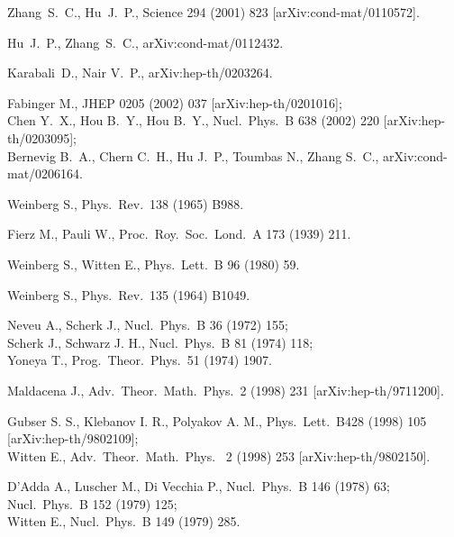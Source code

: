 \documentclass[a4paper,12pt]{article}
\begin{document}
\begin{thebibliography}{10}
\baselineskip=15pt

Zhang~S.~C., Hu~J.~P.,
Science {294} (2001) 823
[arXiv:cond-mat/0110572].

Hu~J.~P., Zhang~S.~C.,
arXiv:cond-mat/0112432.

Karabali~D., Nair V.~P.,
arXiv:hep-th/0203264.

Fabinger M.,
JHEP {0205} (2002) 037
[arXiv:hep-th/0201016];\\
Chen Y.~X., Hou B.~Y., Hou B.~Y.,
Nucl.\ Phys.\ B {638} (2002) 220
[arXiv:hep-th/0203095];\\
Bernevig B.~A., Chern C.~H., Hu J.~P., Toumbas N., Zhang S.~C.,
arXiv:cond-mat/0206164.

Weinberg S.,
Phys.\ Rev.\  {138} (1965) B988.

Fierz M., Pauli W.,
Proc.\ Roy.\ Soc.\ Lond.\ A {173} (1939) 211.

Weinberg S., Witten E.,
Phys.\ Lett.\ B {96} (1980) 59.

Weinberg S.,
Phys.\ Rev.\  {135} (1964) B1049.

Neveu A., Scherk J.,
Nucl.\ Phys.\ B {36} (1972) 155;\\
Scherk J., Schwarz J. H.,
Nucl.\ Phys.\ B {81} (1974) 118;\\
Yoneya T.,
Prog.\ Theor.\ Phys.\  {51} (1974) 1907.

Maldacena J.,
Adv.\ Theor.\ Math.\ Phys.\  {2} (1998) 231
[arXiv:hep-th/9711200].

Gubser S. S., Klebanov I. R., Polyakov A. M.,
Phys.\ Lett.\  {B428} (1998) 105
[arXiv:hep-th/9802109];\\
Witten E.,
Adv.\ Theor.\ Math.\ Phys.\  { 2} (1998) 253
[arXiv:hep-th/9802150].

D'Adda A., Luscher M., Di Vecchia P.,
Nucl.\ Phys.\ B {146} (1978) 63;
Nucl.\ Phys.\ B {152} (1979) 125;\\
Witten E.,
Nucl.\ Phys.\ B {149} (1979) 285.


\end{thebibliography}
\end{document}
